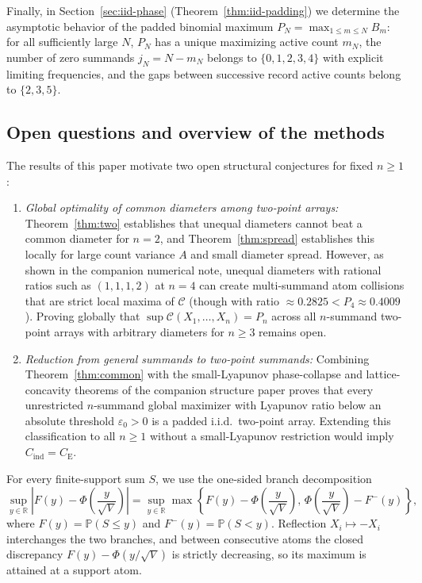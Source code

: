 \documentclass[11pt]{article}
\numberwithin{equation}{section}
\theoremstyle{remark}
\newcommand{\Pp}{\mathbb P}
\newcommand{\R}{\mathbb R}
\newcommand{\ce}{C_{\mathrm E}}
\newcommand{\Cind}{C_{\mathrm{ind}}}
\begin{document}
Finally, in Section~\ref{sec:iid-phase} (Theorem~\ref{thm:iid-padding}) we
determine the asymptotic behavior of the padded binomial maximum
$P_N=\max_{1\le m\le N}B_m$: for all sufficiently large $N$, $P_N$ has a
unique maximizing active count $m_N$, the number of zero summands
$j_N=N-m_N$ belongs to $\{0,1,2,3,4\}$ with explicit limiting frequencies,
and the gaps between successive record active counts belong to $\{2,3,5\}$.

\subsection{Open questions and overview of the methods}

The results of this paper motivate two open structural conjectures for fixed
$n\ge1$:
\begin{enumerate}[label=(\arabic*),leftmargin=2em]
\item \emph{Global optimality of common diameters among two-point arrays:}
Theorem~\ref{thm:two} establishes that unequal diameters cannot beat a common
diameter for $n=2$, and Theorem~\ref{thm:spread} establishes this locally for
large count variance $A$ and small diameter spread. However, as shown in the
companion numerical note, unequal diameters with rational ratios such as
$(1,1,1,2)$ at $n=4$ can create multi-summand atom collisions that are strict
local maxima of $\mathcal C$ (though with ratio $\approx0.2825<P_4\approx0.4009$).
Proving globally that $\sup\mathcal C(X_1,\ldots,X_n)=P_n$ across all
$n$-summand two-point arrays with arbitrary diameters for $n\ge3$ remains open.
\item \emph{Reduction from general summands to two-point summands:}
Combining Theorem~\ref{thm:common} with the small-Lyapunov phase-collapse and
lattice-concavity theorems of the companion structure paper proves that every
unrestricted $n$-summand global maximizer with Lyapunov ratio below an
absolute threshold $\varepsilon_0>0$ is a padded i.i.d.\ two-point array.
Extending this classification to all $n\ge1$ without a small-Lyapunov
restriction would imply $\Cind=\ce$.
\end{enumerate}

For every finite-support sum $S$, we use the one-sided branch decomposition
\begin{equation}\label{eq:branches}
 \sup_{y\in\R}\left|F(y)-\Phi\!\left(\frac y{\sqrt V}\right)\right|
 =\sup_{y\in\R}\max\left\{F(y)-\Phi\!\left(\frac y{\sqrt V}\right),\,
               \Phi\!\left(\frac y{\sqrt V}\right)-F^-(y)\right\},
\end{equation}
where $F(y)=\Pp(S\le y)$ and $F^-(y)=\Pp(S<y)$. Reflection $X_i\mapsto-X_i$
interchanges the two branches, and between consecutive atoms the closed
discrepancy $F(y)-\Phi(y/\sqrt V)$ is strictly decreasing, so its maximum is
attained at a support atom.
\end{document}
